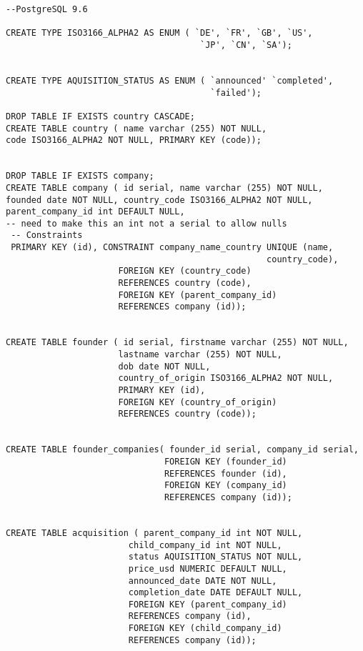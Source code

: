 \documentclass[12pt]{article}
\begin{document}
\begin{verbatim}
--PostgreSQL 9.6

CREATE TYPE ISO3166_ALPHA2 AS ENUM ( `DE', `FR', `GB', `US',
                                      `JP', `CN', `SA');


CREATE TYPE AQUISITION_STATUS AS ENUM ( `announced' `completed',
                                        `failed');

DROP TABLE IF EXISTS country CASCADE;
CREATE TABLE country ( name varchar (255) NOT NULL,
code ISO3166_ALPHA2 NOT NULL, PRIMARY KEY (code));


DROP TABLE IF EXISTS company;
CREATE TABLE company ( id serial, name varchar (255) NOT NULL,
founded date NOT NULL, country_code ISO3166_ALPHA2 NOT NULL,
parent_company_id int DEFAULT NULL,
-- need to make this an int not a serial to allow nulls
 -- Constraints
 PRIMARY KEY (id), CONSTRAINT company_name_country UNIQUE (name,
                                                   country_code),
                      FOREIGN KEY (country_code)
                      REFERENCES country (code),
                      FOREIGN KEY (parent_company_id)
                      REFERENCES company (id));


CREATE TABLE founder ( id serial, firstname varchar (255) NOT NULL,
                      lastname varchar (255) NOT NULL,
                      dob date NOT NULL,
                      country_of_origin ISO3166_ALPHA2 NOT NULL,
                      PRIMARY KEY (id),
                      FOREIGN KEY (country_of_origin)
                      REFERENCES country (code));


CREATE TABLE founder_companies( founder_id serial, company_id serial,
                               FOREIGN KEY (founder_id)
                               REFERENCES founder (id),
                               FOREIGN KEY (company_id)
                               REFERENCES company (id));


CREATE TABLE acquisition ( parent_company_id int NOT NULL,
                        child_company_id int NOT NULL,
                        status AQUISITION_STATUS NOT NULL,
                        price_usd NUMERIC DEFAULT NULL,
                        announced_date DATE NOT NULL,
                        completion_date DATE DEFAULT NULL,
                        FOREIGN KEY (parent_company_id)
                        REFERENCES company (id),
                        FOREIGN KEY (child_company_id)
                        REFERENCES company (id));

\end{verbatim}
\end{document}
